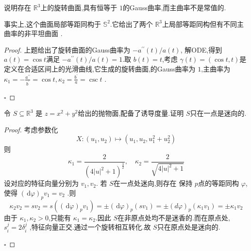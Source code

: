 \documentclass[../../几何与拓扑.tex]{subfiles}
\begin{document}
\begin{problem}
    说明存在 \(  \mathbb{R} ^{3}  \)上的旋转曲面,具有恒等于 \(  1  \)的Gauss曲率,而主曲率不是常值的.  
\end{problem}
\begin{remark}
    事实上,这个曲面局部等距同构于 \(  \mathbb{S}^{2}  \).它给出了两个 \(  \mathbb{R} ^{3}  \)上局部等距同构但有不同主曲率的非平坦曲面 . 
    \end{remark}
\begin{proof}
    上题给出了旋转曲面的Gauss曲率为 \(  -a^{\prime \prime} \left( t \right) /a\left( t \right)    \), 解ODE,得到 \(  a\left( t \right)= \cos t   \)满足 \(  -a^{\prime \prime} \left( t \right) /a\left( t \right)= 1    \).取 \(  b\left( t \right)= t   \),考虑 \(   \gamma \left( t \right)= \left( \cos t,t \right)    \)是定义在合适区间上的光滑曲线,它生成的旋转曲面,的Gauss曲率为 \(  1  \),主曲率为 \(   \kappa _1 = -\frac{a^{\prime \prime}  }{b^{\prime}  }=  \cos t,  \kappa _2 =  \frac{b^{\prime}  }{a }=  \csc t    \)  .

    \hfill $\square$
\end{proof}


\hspace*{\fill} 


\begin{problem}
    令 \(  S\subseteq \mathbb{R} ^{3}  \) 是 \(  z =  x^{2}+ y^{2}  \)给出的抛物面,配备了诱导度量.证明 \(  S  \)只在一点是迷向的.  
\end{problem}
\begin{proof}
    考虑参数化 \[
   X: \left( u_1,u_2 \right)\mapsto \left( u_1,u_2,u_1^{2}+ u_2^{2} \right)  
    \]则 \[
     \kappa _1 = \frac{2 }{\left( 4\left| u \right|^{2}+ 1  \right)^{\frac{3}{2}}  } ,\quad   \kappa _2 =  \frac{2 }{\sqrt{4\left| u \right|^{2}+ 1 } }  
    \]设对应的特征向量分别为 \(  v_1,v_2  \). 
    若 \(  S  \)在一点处迷向,则存在  保持 \(  p  \)点的等距同构 \(   \varphi   \),使得 \(  \left( \,\mathrm{d}  \varphi  \right)_{p}v_1= v_2   \)   .则  \[
    \kappa _2 v_2=  sv_2=  s\left( \left( \,\mathrm{d}  \varphi  \right)_{p}v_1  \right)=  \pm \left( \,\mathrm{d}  \varphi  \right)_{p}\left( sv_1 \right)  = \pm \left( d\varphi  \right)_{p}\left(  \kappa _1 v_1 \right)=   \pm  \kappa _1 v_2
    \]由于 \(   \kappa _1 , \kappa _2 >0  \),只能有 \(   \kappa _1 =  \kappa _2   \).因此 \(  S  \)在非原点处均不是迷香的.而在原点处, \(  s_{i}^{j}= 2 \delta  _{i}^{j}  \)    ,特征向量正交.通过一个旋转相互转化.故 \(  S  \)只在原点处是迷向的. 
    
    \hfill $\square$
\end{proof}
\hspace*{\fill} 
\end{document}
